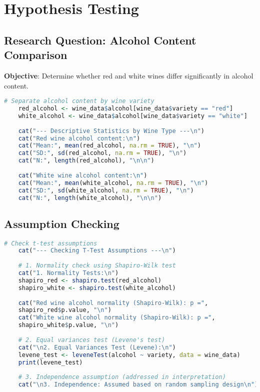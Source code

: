 \section{Hypothesis Testing}

\subsection{Research Question: Alcohol Content Comparison}

\textbf{Objective}: Determine whether red and white wines differ significantly in alcohol content.

\begin{lstlisting}[language=R, caption=Alcohol Content Analysis by Wine Type, breaklines=true]
	# Separate alcohol content by wine variety
	red_alcohol <- wine_data$alcohol[wine_data$variety == "red"]
	white_alcohol <- wine_data$alcohol[wine_data$variety == "white"]
	
	cat("--- Descriptive Statistics by Wine Type ---\n")
	cat("Red wine alcohol content:\n")
	cat("Mean:", mean(red_alcohol, na.rm = TRUE), "\n")
	cat("SD:", sd(red_alcohol, na.rm = TRUE), "\n")
	cat("N:", length(red_alcohol), "\n\n")
	
	cat("White wine alcohol content:\n")
	cat("Mean:", mean(white_alcohol, na.rm = TRUE), "\n")
	cat("SD:", sd(white_alcohol, na.rm = TRUE), "\n")
	cat("N:", length(white_alcohol), "\n\n")
\end{lstlisting}

\subsection{Assumption Checking}

\begin{lstlisting}[language=R, caption=T-Test Assumption Testing, breaklines=true]
	# Check t-test assumptions
	cat("--- Checking T-Test Assumptions ---\n")
	
	# 1. Normality check using Shapiro-Wilk test
	cat("1. Normality Tests:\n")
	shapiro_red <- shapiro.test(red_alcohol)
	shapiro_white <- shapiro.test(white_alcohol)
	
	cat("Red wine alcohol normality (Shapiro-Wilk): p =", 
	shapiro_red$p.value, "\n")
	cat("White wine alcohol normality (Shapiro-Wilk): p =", 
	shapiro_white$p.value, "\n")
	
	# 2. Equal variances test (Levene's test)
	cat("\n2. Equal Variances Test (Levene):\n")
	levene_test <- leveneTest(alcohol ~ variety, data = wine_data)
	print(levene_test)
	
	# 3. Independence assumption (addressed in interpretation)
	cat("\n3. Independence: Assumed based on random sampling design\n")
\end{lstlisting}

